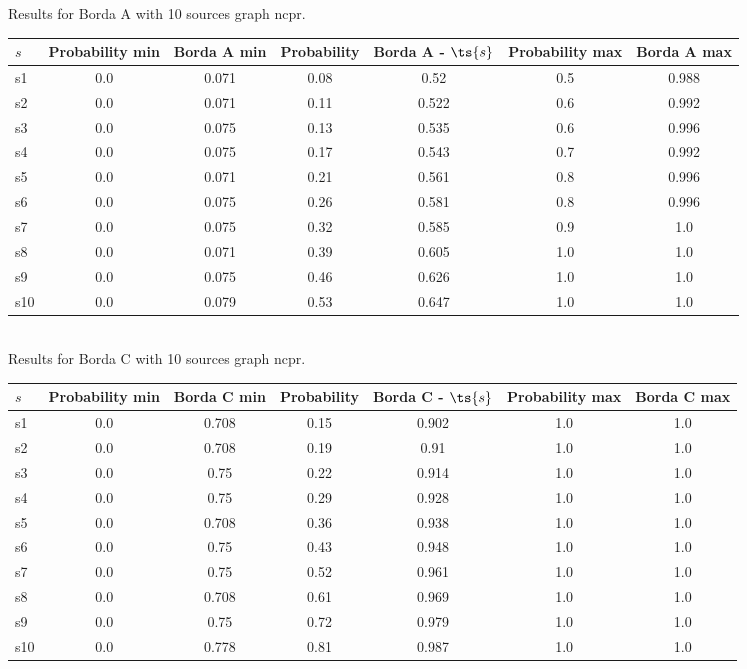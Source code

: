 \documentclass{article}
\begin{document}
\noindent Results for Borda A with 10 sources graph ncpr.

\noindent\begin{tabular}{|l|c|c|c|c|c|c|}
\hline
$s$& Probability min & Borda A min & Probability & Borda A - $\ts{s}$ & Probability max & Borda A max\\
\hline
s1 &0.0 & 0.071 & 0.08 & 0.52 & 0.5 & 0.988\\
\hline
s2 &0.0 & 0.071 & 0.11 & 0.522 & 0.6 & 0.992\\
\hline
s3 &0.0 & 0.075 & 0.13 & 0.535 & 0.6 & 0.996\\
\hline
s4 &0.0 & 0.075 & 0.17 & 0.543 & 0.7 & 0.992\\
\hline
s5 &0.0 & 0.071 & 0.21 & 0.561 & 0.8 & 0.996\\
\hline
s6 &0.0 & 0.075 & 0.26 & 0.581 & 0.8 & 0.996\\
\hline
s7 &0.0 & 0.075 & 0.32 & 0.585 & 0.9 & 1.0\\
\hline
s8 &0.0 & 0.071 & 0.39 & 0.605 & 1.0 & 1.0\\
\hline
s9 &0.0 & 0.075 & 0.46 & 0.626 & 1.0 & 1.0\\
\hline
s10 &0.0 & 0.079 & 0.53 & 0.647 & 1.0 & 1.0\\
\hline
\end{tabular}\\

\noindent Results for Borda C with 10 sources graph ncpr.

\noindent\begin{tabular}{|l|c|c|c|c|c|c|}
\hline
$s$& Probability min & Borda C min & Probability & Borda C - $\ts{s}$ & Probability max & Borda C max\\
\hline
s1 &0.0 & 0.708 & 0.15 & 0.902 & 1.0 & 1.0\\
\hline
s2 &0.0 & 0.708 & 0.19 & 0.91 & 1.0 & 1.0\\
\hline
s3 &0.0 & 0.75 & 0.22 & 0.914 & 1.0 & 1.0\\
\hline
s4 &0.0 & 0.75 & 0.29 & 0.928 & 1.0 & 1.0\\
\hline
s5 &0.0 & 0.708 & 0.36 & 0.938 & 1.0 & 1.0\\
\hline
s6 &0.0 & 0.75 & 0.43 & 0.948 & 1.0 & 1.0\\
\hline
s7 &0.0 & 0.75 & 0.52 & 0.961 & 1.0 & 1.0\\
\hline
s8 &0.0 & 0.708 & 0.61 & 0.969 & 1.0 & 1.0\\
\hline
s9 &0.0 & 0.75 & 0.72 & 0.979 & 1.0 & 1.0\\
\hline
s10 &0.0 & 0.778 & 0.81 & 0.987 & 1.0 & 1.0\\
\hline
\end{tabular}\\
\end{document}
